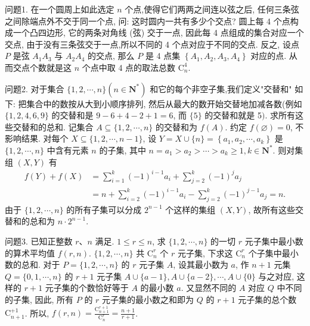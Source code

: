 
问题1. 在一个圆周上如此选定 $n$ 个点,使得它们两两之间连以弦之后, 任何三条弦之间除端点外不交于同一个点, 问: 这时圆内一共有多少个交点?
圆上每 4 个点构成一个凸四边形, 它的两条对角线 (弦) 交于一点, 因此每 4 点组成的集合对应一个交点, 由于没有三条弦交于一点,所以不同的 4 个点对应于不同的交点.
反之, 设点 $P$ 是弦 $A_1 A_3$ 与 $A_2 A_4$ 的交点, 那么 $P$ 是 4 点集 $\left\{A_1, A_2, A_3, A_4\right\}$ 对应的点.
从而交点个数就是这 $n$ 个点中取 4 点的取法总数 $\mathrm{C}_n^4$.



问题2. 对于集合 $\{1,2, \cdots, n\}\left(n \in \mathbf{N}^*\right)$ 和它的每个非空子集,我们定义"交替和" 如下: 把集合中的数按从大到小顺序排列, 然后从最大的数开始交替地加减各数(例如 $\{1,2,4,6,9\}$ 的交替和是 $9-6+4-2+1=6$, 而 $\{5\}$ 的交替和就是 5$)$. 求所有这些交替和的总和.
记集合 $A \subseteq\{1,2, \cdots, n\}$ 的交替和为 $f(A)$. 约定 $f(\varnothing)=0$, 不影响结果.
对每个 $X \subseteq\{1,2, \cdots, n-1\}$, 设 $Y=X \cup\{n\}=\left\{a_1, a_2, \cdots, a_k\right\}$ 是 $\{1,2, \cdots, n\}$ 中含有元素 $n$ 的子集, 其中 $n=a_1>a_2>\cdots>a_k \geqslant 1, k \in \mathbf{N}^*$. 则对集组 $(X, Y)$ 有
$$
\begin{aligned}
f(Y)+f(X) & =\sum_{i=1}^k(-1)^{i-1} a_i+\sum_{j=2}^k(-1)^j a_j \\
& =n+\sum_{i=2}^k(-1)^{i-1} a_i-\sum_{j=2}^k(-1)^{j-1} a_j=n .
\end{aligned}
$$
由于 $\{1,2, \cdots, n\}$ 的所有子集可以分成 $2^{n-1}$ 个这样的集组 $(X, Y)$, 故所有这些交替和的总和为 $n \cdot 2^{n-1}$.



问题3. 已知正整数 $r 、 n$ 满足.
$1 \leqslant r \leqslant n$, 求 $\{1,2, \cdots, n\}$ 的一切 $r$ 元子集中最小数的算术平均值 $f(r, n)$.
$\{1,2, \cdots, n\}$ 共 $\mathrm{C}_n^r$ 个 $r$ 元子集, 下求这 $\mathrm{C}_n^r$ 个子集中最小数的总和.
对于 $P=\{1,2, \cdots, n\}$ 的 $r$ 元子集 $A$, 设其最小数为 $a$, 作 $n+1$ 元集 $Q= \{0,1, \cdots, n\}$ 的 $r+1$ 元子集 $A \cup\{a-1\}, A \cup\{a-2\}, \cdots, A \cup\{0\}$ 与之对应, 这样的 $r+1$ 元子集的个数恰好等于 $A$ 的最小数 $a$. 又显然不同的 $A$ 对应 $Q$ 中不同的子集, 因此, 所有 $P$ 的 $r$ 元子集的最小数之和即为 $Q$ 的 $r+1$ 元子集的总个数 $\mathrm{C}_{n+1}^{+1}$.
所以, $f(r, n)=\frac{\mathrm{C}_{n+1}^{r+1}}{\mathrm{C}_n^r}=\frac{n+1}{r+1}$.



